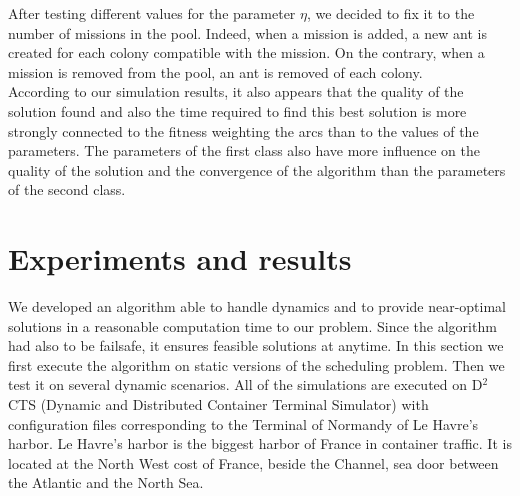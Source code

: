 \documentclass[a4paper,10pt]{article}
\begin{document}
After testing different values for the parameter $\eta$, we decided to fix it to the number of missions in the pool. Indeed, when a mission is added, a new ant is created for each colony compatible with the mission. On the contrary, when a mission is removed from the pool, an ant is removed of each colony.\\

According to our simulation results, it also appears that the quality of the solution found and also the time required to find this best solution is more strongly connected to the fitness weighting the arcs than to the values of the parameters. The parameters of the first class also have more influence on the quality of the solution and the convergence of the algorithm than the parameters of the second class.

\section{Experiments and results}\label{sec:expe}
   We developed an algorithm able to handle dynamics and to provide near-optimal solutions in a reasonable computation time to our problem. Since the algorithm had also to be failsafe, it ensures feasible solutions at anytime. In this section we first execute the algorithm on static versions of the scheduling problem. Then we test it on several dynamic scenarios.
   All of the simulations are executed on D$^2$CTS (Dynamic and Distributed Container Terminal Simulator)\cite{Lesauvage2011} with configuration files corresponding to the Terminal of Normandy of Le Havre's harbor. Le Havre’s harbor is the biggest harbor of France in container traffic. It is located at the North West cost of France, beside the Channel, sea door between the Atlantic and the North Sea.

\end{document}
